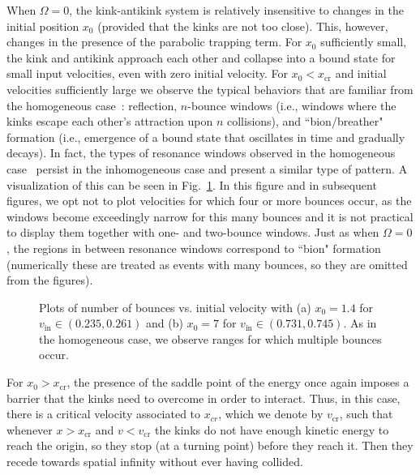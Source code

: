 \documentclass[vecphys]{svmult}		%
\begin{document}
When $\Omega=0$, the kink-antikink system is relatively insensitive to changes in the initial position $x_0$ (provided that the kinks are not too close).
This, however, changes in the presence of the
parabolic trapping term. For $x_0$ sufficiently small, the kink and
antikink approach each other and collapse into a bound state for small input velocities, even with zero initial velocity. For $x_0<x_\mathrm{cr}$ and initial velocities sufficiently large we observe the typical behaviors that
are familiar from the homogeneous case~\cite{campbell,anninos}: reflection,
$n$-bounce windows (i.e., windows where the kinks escape each
other's attraction upon $n$ collisions), and  {``bion/breather" \cite{eilbeck,campbell} formation (i.e.,
emergence of a bound state that oscillates in time and gradually decays). In fact, the types of resonance windows observed in the homogeneous case~\cite{campbell,anninos,goodman2}}
persist in the inhomogeneous case and present a similar
type of  pattern. A visualization of this can be seen in Fig.~\ref{windows_Omega_015}. In this figure and in subsequent figures, we opt not to plot velocities for which
four or more bounces occur, as the windows become exceedingly narrow
for this many bounces and it is not practical to display them
together with one- and two-bounce windows. Just as when $\Omega=0$, the regions in between resonance windows correspond to ``bion" formation (numerically
these are treated as events with many bounces, so they are omitted from the
figures). 





\begin{figure}[tbp]
\begin{center}
      \subfigure[]{{\texttt{[image: x0\_1\_4]}}}
      \subfigure[]{{\texttt{[image: x0\_7]}}}
  \end{center}
   \caption{ Plots of number of bounces vs. initial velocity with (a) $x_0=1.4$ for $v_\mathrm{in} \in (0.235, 0.261)$ and (b) $x_0=7$ for $v_\mathrm{in} \in (0.731,0.745) $. As in the homogeneous case, we observe ranges for which multiple bounces occur.}
    \label{windows_Omega_015}
\end{figure}




For $x_0 > x_\mathrm{cr}$,
the presence of the saddle point of the energy once again imposes
a barrier that the kinks need to overcome in order to interact.
Thus, in this case, there is a critical velocity associated to $x_{cr}$, which we denote by $v_\mathrm{cr}$, such that whenever $x>x_\mathrm{cr}$ and $v < v_\mathrm{cr}$ the kinks do not have enough kinetic energy to reach the origin, so they stop (at a turning point) before they reach it. Then they recede
towards spatial infinity without ever having collided.
\end{document}
